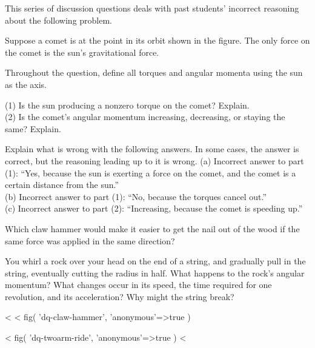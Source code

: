 \begin{dq}
This series of discussion questions deals with past
students' incorrect reasoning about the following problem.

\begin{indentedblock}
Suppose a comet is at the point in its orbit shown in the
figure. The only force on the comet is the sun's gravitational force.

\noindent{}

\noindent Throughout the question, define all torques and angular
momenta using the sun as the axis.

\noindent (1) Is the sun producing a nonzero torque on the comet? Explain.\\
(2) Is the comet's angular momentum increasing, decreasing,
or staying the same? Explain.
\end{indentedblock}

\noindent Explain what is wrong with the following answers. In some
cases, the answer is correct, but the reasoning leading up to it is wrong.
(a) Incorrect answer to part (1): ``Yes, because the sun is
exerting a force on the comet, and the comet is a certain
distance from the sun.''\\
(b) Incorrect answer to part (1): ``No, because the
torques cancel out.''\\
(c) Incorrect answer to part (2): ``Increasing, because the
comet is speeding up.''
\end{dq}

\begin{dq}\label{dq:claw-hammer}
Which claw hammer would make it easier to get the nail
out of the wood if the same force was applied in the same direction?
\end{dq}

\begin{dq}
You whirl a rock over your head on the end of a string,
and gradually pull in the string, eventually cutting the
radius in half. What happens to the rock's angular momentum?
What changes occur in its speed, the time required for one
revolution, and its acceleration? Why might the string break?
\end{dq}
<%
<%
  fig(
    'dq-claw-hammer',
    {
      'anonymous'=>true
    }
  )

\spacebetweenfigs

<%
  fig(
    'dq-twoarm-ride',
    {
      'anonymous'=>true
    }
  )
<%

